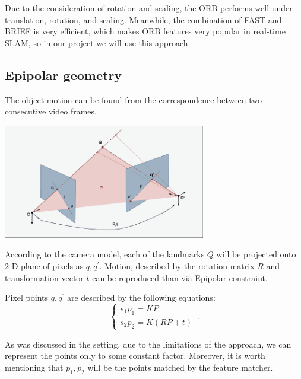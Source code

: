 Due to the consideration of rotation and scaling, the ORB performs well under translation, rotation, and scaling. Meanwhile, the combination of FAST and BRIEF is very efficient, which makes ORB features very popular in real-time SLAM, so in our project we will use this approach.


\subsection{Epipolar geometry}

The object motion can be found from the correspondence between two consecutive video frames. 
\begin{center}
    \includegraphics[height=5cm]{nc.png}\\[1cm]
\end{center}

According to the camera model, each of the landmarks $Q$ will be projected onto 2-D plane of pixels as $q, q^{\prime}$. Motion, described by the rotation matrix $R$ and transformation vector $t$ can be reproduced than via Epipolar constraint. 

Pixel points $q, q^{\prime}$ are described by the following equations:
\begin{equation}
    \begin{cases}
      s_{1} p_{1} = K P\\
      s_{2} p_{2} = K(RP + t)
    \end{cases}\,.
\end{equation}

As was discussed in the setting, due to the limitations of the approach, we can represent the points only to some constant factor. Moreover, it is worth mentioning that $p_{1}, p_{2}$ will be the points matched by the feature matcher.

